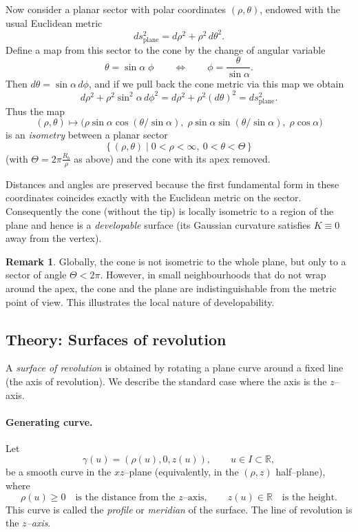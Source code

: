 \documentclass[12pt,a4paper]{article}
\theoremstyle{plain}
\theoremstyle{definition}      %
\newtheorem{remark}[theorem]{Remark}
\begin{document}
	Now consider a planar sector with polar coordinates $(\rho,\theta)$, endowed
	with the usual Euclidean metric
	\[
	ds^2_{\text{plane}} = d\rho^2 + \rho^2\,d\theta^2.
	\]
	Define a map from this sector to the cone by the change of angular variable
	\[
	\theta = \sin\alpha\;\phi
	\qquad\Longleftrightarrow\qquad
	\phi = \frac{\theta}{\sin\alpha}.
	\]
	Then $d\theta = \sin\alpha\,d\phi$, and if we pull back the cone metric via this
	map we obtain
	\[
	d\rho^2 + \rho^2\sin^2\alpha\,d\phi^2
	= d\rho^2 + \rho^2(d\theta)^2
	= ds^2_{\text{plane}}.
	\]
	Thus the map
	\[
	(\rho,\theta) \longmapsto
	\bigl(\rho\sin\alpha\cos(\theta/\sin\alpha),\;
	\rho\sin\alpha\sin(\theta/\sin\alpha),\;
	\rho\cos\alpha\bigr)
	\]
	is an \emph{isometry} between a planar sector
	\[
	\{\,(\rho,\theta)\mid 0<\rho<\infty,\ 0<\theta<\Theta\,\}
	\]
	(with $\Theta = 2\pi\frac{R_b}{\rho}$ as above) and the cone with its apex
	removed.
	
	Distances and angles are preserved because the first fundamental form in these
	coordinates coincides exactly with the Euclidean metric on the sector.
	Consequently the cone (without the tip) is locally isometric to a region of the
	plane and hence is a \emph{developable} surface (its Gaussian curvature
	satisfies $K\equiv0$ away from the vertex).
	
	\begin{remark}
		Globally, the cone is not isometric to the whole plane, but only to a sector of
		angle $\Theta<2\pi$.  However, in small neighbourhoods that do not wrap around
		the apex, the cone and the plane are indistinguishable from the metric point of
		view.  This illustrates the local nature of developability.
	\end{remark}
	
	\subsection*{Theory: Surfaces of revolution}
	
	A \emph{surface of revolution} is obtained by rotating a plane curve around a
	fixed line (the axis of revolution).  We describe the standard case where the
	axis is the $z$--axis.
	
	\paragraph{Generating curve.}
	Let
	\[
	\gamma(u) = (\rho(u),0,z(u)),\qquad u\in I\subset\mathbb{R},
	\]
	be a smooth curve in the $xz$--plane (equivalently, in the $(\rho,z)$
	half–plane), where
	\[
	\rho(u)\ge0\quad\text{is the distance from the $z$--axis},\qquad
	z(u)\in\mathbb{R}\quad\text{is the height}.
	\]
	This curve is called the \emph{profile} or \emph{meridian} of the surface.
	The line of revolution is the \emph{$z$--axis}.
	
\end{document}
